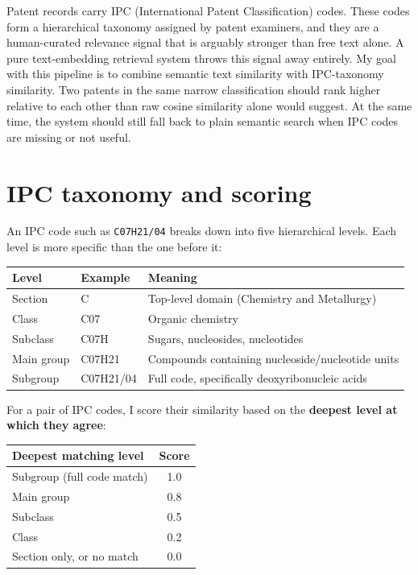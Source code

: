\documentclass[11pt]{article}
\begin{document}
Patent records carry IPC (International Patent Classification) codes. These codes
form a hierarchical taxonomy assigned by patent examiners, and they are a
human-curated relevance signal that is arguably stronger than free text alone. A
pure text-embedding retrieval system throws this signal away entirely. My goal with
this pipeline is to combine semantic text similarity with IPC-taxonomy similarity.
Two patents in the same narrow classification should rank higher relative to each
other than raw cosine similarity alone would suggest. At the same time, the system
should still fall back to plain semantic search when IPC codes are missing or not
useful.

\section{IPC taxonomy and scoring}

An IPC code such as \texttt{C07H21/04} breaks down into five hierarchical levels.
Each level is more specific than the one before it:

\begin{center}
\small
\begin{tabular}{lll}
  \toprule
  \textbf{Level} & \textbf{Example} & \textbf{Meaning} \\
  \midrule
  Section    & C          & Top-level domain (Chemistry and Metallurgy) \\
  Class      & C07        & Organic chemistry \\
  Subclass   & C07H       & Sugars, nucleosides, nucleotides \\
  Main group & C07H21     & Compounds containing nucleoside/nucleotide units \\
  Subgroup   & C07H21/04  & Full code, specifically deoxyribonucleic acids \\
  \bottomrule
\end{tabular}
\end{center}

For a pair of IPC codes, I score their similarity based on the \textbf{deepest level
at which they agree}:

\begin{center}
\small
\begin{tabular}{lc}
  \toprule
  \textbf{Deepest matching level} & \textbf{Score} \\
  \midrule
  Subgroup (full code match)   & 1.0 \\
  Main group                   & 0.8 \\
  Subclass                     & 0.5 \\
  Class                        & 0.2 \\
  Section only, or no match    & 0.0 \\
  \bottomrule
\end{tabular}
\end{center}
\end{document}
